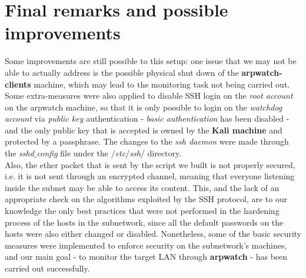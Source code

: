 \section{Final remarks and possible improvements}
Some improvements are still possible to this setup: one issue that we may not be able to actually address is the possible physical shut down of the \textbf{arpwatch-clients} machine, which may lead to the monitoring task not being carried out.\\
Some extra-measures were also applied to disable SSH login on the \textit{root account} on the arpwatch machine, so that it is only possible to login on the \textit{watchdog account} via \textit{public key} authentication - \textit{basic authentication} has been disabled - and the only public key that is accepted is owned by the \textbf{Kali machine} and protected by a passphrase. The changes to the \textit{ssh daemon} were made through the \textit{sshd$\_$config} file under the \textit{$/$etc$/$ssh$/$} directory.\\
Also, the ether packet that is sent by the script we built is not properly secured, i.e. it is not sent through an encrypted channel, meaning that everyone listening inside the subnet may be able to access its content. This, and the lack of an appropriate check on the algorithms exploited by the SSH protocol, are to our knowledge the only best practices that were not performed in the hardening process of the hosts in the subnetwork, since all the default passwords on the hosts were also either changed or disabled.
Nonetheless, some of the basic security measures were implemented to enforce security on the subnetwork's machines, and our main goal - to monitor the target LAN through \textbf{arpwatch} - has been carried out successfully.
